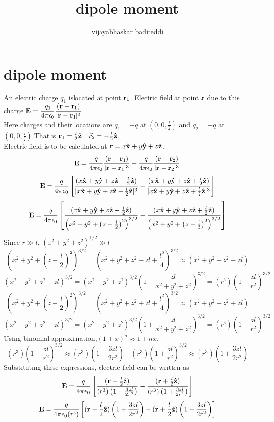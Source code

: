 \documentclass[12pt]{article}
\title{dipole moment}
\author{vijayabhaskar badireddi}
\begin{document}
\section*{dipole moment}
An electric charge $q_1$ islocated at point $\vb{r}_1$. Electric field at point $\vb{r}$ due to this charge $\displaystyle \vb{E}=\frac{q_1}{4\pi\epsilon_0}\frac{(\vb{r}-\vb{r}_1)}{|\vb{r}-\vb{r}_1|^3}$.\\
Here charges and their locations are $q_1=+q$ at $\left(0,0,\frac{l}{2}\right)$ and $q_2=-q$ at $\left(0,0,\frac{l}{2}\right)$.That is $\vb{r}_1=\frac{l}{2}\vu{z}\quad\vec{r}_2=-\frac{l}{2}\vu{z}$.\\
Electric field is to be calculated at $\vb{r}=x\vu{x}+y\vu{y}+z\vu{z}$.
\[\vb{E}=\frac{q}{4\pi\epsilon_0}\frac{(\vb{r}-\vb{r}_1)}{|\vb{r}-\vb{r}_1|^3}-\frac{q}{4\pi\epsilon_0}\frac{(\vb{r}-\vb{r}_2)}{|\vb{r}-\vb{r}_2|^3}\]
\[\vb{E}=\frac{q}{4\pi\epsilon_0}\left[\frac{(x\vu{x}+y\vu{y}+z\vu{z}-\frac{l}{2}\vu{z})}{|x\vu{x}+y\vu{y}+z\vu{z}-\frac{l}{2}\vu{z}|^3}-\frac{(x\vu{x}+y\vu{y}+z\vu{z}+\frac{l}{2}\vu{z})}{|x\vu{x}+y\vu{y}+z\vu{z}+\frac{l}{2}\vu{z}|^3}\right]\]
\[\vb{E}=\frac{q}{4\pi\epsilon_0}\left[\frac{(x\vu{x}+y\vu{y}+z\vu{z}-\frac{l}{2}\vu{z})}{\left(x^2+y^2+\left(z-\frac{l}{2}\right)^2\right)^{3/2}}-\frac{(x\vu{x}+y\vu{y}+z\vu{z}+\frac{l}{2}\vu{z})}{\left(x^2+y^2+\left(z+\frac{l}{2}\right)^2\right)^{3/2}}\right]\]
Since $r\gg l$, $(x^2+y^2+z^2)^{1/2}\gg l$\\
\[\left(x^2+y^2+\left(z-\frac{l}{2}\right)^2\right)^{3/2}=\left(x^2+y^2+z^2-zl+\frac{l^2}{4}\right)^{3/2}\approx\left(x^2+y^2+z^2-zl\right)\]
\[\left(x^2+y^2+z^2-zl\right)^{3/2}=(x^2+y^2+z^2)^{3/2}\left(1-\frac{zl}{x^2+y^2+z^2}\right)^{3/2}=(r^3)\left(1-\frac{zl}{r^2}\right)^{3/2}\]
\[\left(x^2+y^2+\left(z+\frac{l}{2}\right)^2\right)^{3/2}=\left(x^2+y^2+z^2+zl+\frac{l^2}{4}\right)^{3/2}\approx\left(x^2+y^2+z^2+zl\right)\]
\[\left(x^2+y^2+z^2+zl\right)^{3/2}=(x^2+y^2+z^2)^{3/2}\left(1+\frac{zl}{x^2+y^2+z^2}\right)^{3/2}=(r^3)\left(1+\frac{zl}{r^2}\right)^{3/2}\]
Using binomial approximation,$(1+x)^n\approx1+nx$, \[(r^3)\left(1-\frac{zl}{r^2}\right)^{3/2}\approx(r^3)\left(1-\frac{3zl}{2r^2}\right)\quad(r^3)\left(1+\frac{zl}{r^2}\right)^{3/2}\approx(r^3)\left(1+\frac{3zl}{2r^2}\right)\]
Substituting these expressions, electric field can be written as
\[\vb{E}=\frac{q}{4\pi\epsilon_0}\left[\frac{(\vb{r}-\frac{l}{2}\vu{z})}{(r^3)\left(1-\frac{3zl}{2r^2}\right)}-\frac{(\vb{r}+\frac{l}{2}\vu{z})}{(r^3)\left(1+\frac{3zl}{2r^2}\right)}\right]\]
\[\vb{E}=\frac{q}{4\pi\epsilon_0(r^3)}\left[(\vb{r}-\frac{l}{2}\vu{z})\left(1+\frac{3zl}{2r^2}\right)-(\vb{r}+\frac{l}{2}\vu{z})\left(1-\frac{3zl}{2r^2}\right)\right]\]
\end{document}
